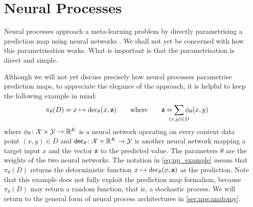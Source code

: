 \documentclass[12pt, twoside]{report}
\begin{document}
\section{Neural Processes}
\label{sec:nps:neural_processes}

Neural processes \parencite{Garnelo:2018:Conditional_Neural_Processes,Garnelo:2018:Neural_Processes}
approach a meta-learning problem by directly parametrising a prediction map using neural networks \parencite{McCulloch:1943:A_Logical_Calculus_of_Ideas,Rosenblatt:1958:The_Perceptron_A_Probabilistic_Model,Ivakhnenko:1965:Cybernetic_Predicting_Devices,Fukushima:1982:Neocognitron_A_Self-Organizing_Neural_Network,Werbos:1982:Applications_of_Advances_in_Nonlinear,LeCun:1989:Backpropagation_Applied_to_Handwritten_Zip}.
We shall not yet be concerned with how this parametrisation works.
What is important is that the parametrisation is direct and simple.

Although we will not yet discuss precisely how neural processes parametrise prediction maps, to appreciate the elegance of the approach, it is helpful to keep the following example in mind:
\begin{equation} \label{eq:np_example}
    \pi_\theta(D) = x \mapsto \operatorname{dec}_\theta(x, \vz)
    \qquad \text{where} \qquad
    \vz = \sum_{\mathclap{(x, y) \in D}} \phi_\theta(x, y)
\end{equation}
where
$\phi_\theta \colon \mathcal{X} \times \mathcal{Y} \to \mathbb{R}^K$ is a neural network operating on every context data point $(x, y) \in D$ and
$\mathsf{dec}_\theta \colon \mathcal{X} \times \mathbb{R}^K \to \mathcal{Y}$ is another neural network mapping a target input $x$ and the vector $\mathbf{z} $ to the predicted value.
The parameters $\theta$ are the weights of the two neural networks.
The notation in \eqref{eq:np_example} means that $\pi_\theta(D)$ returns the deterministic function $x \mapsto \operatorname{dec}_\theta(x, \mathbf{z})$ as the prediction.
Note that this example does not fully exploit the prediction map formalism, because $\pi_\theta(D)$ may return a random function, that is, a stochastic process.
We will return to the general form of neural process architectures in \cref{sec:nps:anatomy}.
\end{document}
